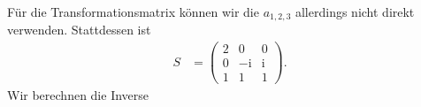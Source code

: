 \documentclass[english, parskip=full]{scrartcl}
\renewcommand{\i}{\text{i}}
\begin{document}
Für die Transformationsmatrix können wir die $a_{1,2,3}$ allerdings nicht direkt verwenden.
Stattdessen ist
\begin{align}
S &= \begin{pmatrix}
2 & 0 & 0 \\ 0 & -\i & \i \\ 1 & 1 & 1
\end{pmatrix}.
\end{align}
Wir berechnen die Inverse
\end{document}
